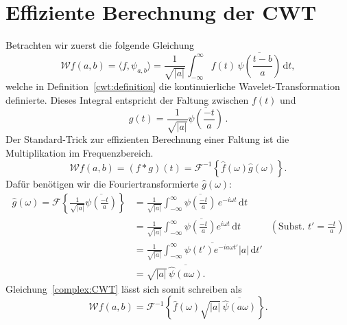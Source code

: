 \section{Effiziente Berechnung der CWT}

Betrachten wir zuerst die folgende Gleichung
\begin{equation}
\mathcal{W}f (a,b)
=
\langle f,\psi_{a,b}\rangle
=
\frac{1}{\sqrt{|a|}}\int_{-\infty}^\infty f(t)\,
	\overline{\psi\left(\frac{t-b}{a}\right)}\,\mathrm{d}t,\label{complex:CWT}
\end{equation}
welche in Definition~\ref{cwt:definition} die kontinuierliche Wavelet-Transformation definierte.
Dieses Integral entspricht der Faltung zwischen $f(t)$ und 
\begin{equation} 
    g(t) 
    = \frac{1}{\sqrt{|a|}} \overline{\psi\left(\frac{-t}{a}\right)} \,.
\end{equation}
Der Standard-Trick zur effizienten Berechnung einer Faltung ist die Multiplikation im Frequenzbereich.
\begin{equation} 
\mathcal{W}f (a,b) = (f*g)(t) = \mathcal{F}^{-1}\left\lbrace\hat f(\omega) \hat g (\omega) \right\rbrace.
\end{equation}
Dafür benötigen wir die Fouriertransformierte $\hat g (\omega)$:
\begin{align*}
	\hat g (\omega) = 
    \mathcal{F}\left\lbrace \frac{1}{\sqrt{|a|}} \overline{\psi\left(\frac{-t}{a}\right)}\right\rbrace 
	&= \frac{1}{\sqrt{|a|}} \int_{-\infty}^{\infty}\overline{\psi\left(\frac{-t}{a}\right)}\,e^{-i\omega t}\,\mathrm{d}t\\
	&= \frac{1}{\sqrt{|a|}} \overline{\int_{-\infty}^{\infty}\psi\left(\frac{-t}{a}\right)e^{i\omega t}\,\mathrm{d}t}  
    & \left(\text{Subst. } t' = \frac{-t}{a}\right)\\
	&= \frac{1}{\sqrt{|a|}} \overline{\int_{-\infty}^{\infty}\psi\left(t'\right)e^{-ia\omega t'} |a|\,\mathrm{d}t'}\\
	&= \sqrt{|a|} \, \overline{\hat{\psi}\left(a\omega\right)}.
\end{align*}
Gleichung~\eqref{complex:CWT} lässt sich somit schreiben als
\begin{equation}
\mathcal{W}f(a,b)
= \mathcal{F}^{-1}\left\lbrace\hat{f}(\omega) \sqrt{|a|}\, \overline{\hat{\psi}\left(a\omega\right)}\right\rbrace. \label{complex:fcwt}
\end{equation}

